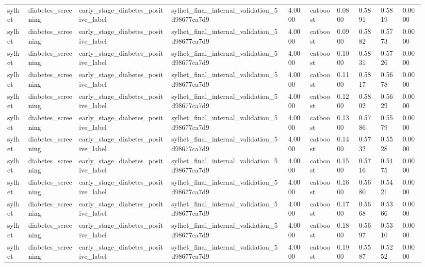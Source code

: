\begin{tabular}{llllllllll}
sylhet & diabetes\_screening & early\_stage\_diabetes\_positive\_label & sylhet\_final\_internal\_validation\_5d98677ca7d9 & 4.0000 & catboost & 0.0800 & 0.5891 & 0.5819 & 0.0000 \\
sylhet & diabetes\_screening & early\_stage\_diabetes\_positive\_label & sylhet\_final\_internal\_validation\_5d98677ca7d9 & 4.0000 & catboost & 0.0900 & 0.5882 & 0.5773 & 0.0000 \\
sylhet & diabetes\_screening & early\_stage\_diabetes\_positive\_label & sylhet\_final\_internal\_validation\_5d98677ca7d9 & 4.0000 & catboost & 0.1000 & 0.5831 & 0.5726 & 0.0000 \\
sylhet & diabetes\_screening & early\_stage\_diabetes\_positive\_label & sylhet\_final\_internal\_validation\_5d98677ca7d9 & 4.0000 & catboost & 0.1100 & 0.5817 & 0.5678 & 0.0000 \\
sylhet & diabetes\_screening & early\_stage\_diabetes\_positive\_label & sylhet\_final\_internal\_validation\_5d98677ca7d9 & 4.0000 & catboost & 0.1200 & 0.5802 & 0.5629 & 0.0000 \\
sylhet & diabetes\_screening & early\_stage\_diabetes\_positive\_label & sylhet\_final\_internal\_validation\_5d98677ca7d9 & 4.0000 & catboost & 0.1300 & 0.5786 & 0.5579 & 0.0000 \\
sylhet & diabetes\_screening & early\_stage\_diabetes\_positive\_label & sylhet\_final\_internal\_validation\_5d98677ca7d9 & 4.0000 & catboost & 0.1400 & 0.5732 & 0.5528 & 0.0000 \\
sylhet & diabetes\_screening & early\_stage\_diabetes\_positive\_label & sylhet\_final\_internal\_validation\_5d98677ca7d9 & 4.0000 & catboost & 0.1500 & 0.5716 & 0.5475 & 0.0000 \\
sylhet & diabetes\_screening & early\_stage\_diabetes\_positive\_label & sylhet\_final\_internal\_validation\_5d98677ca7d9 & 4.0000 & catboost & 0.1600 & 0.5680 & 0.5421 & 0.0000 \\
sylhet & diabetes\_screening & early\_stage\_diabetes\_positive\_label & sylhet\_final\_internal\_validation\_5d98677ca7d9 & 4.0000 & catboost & 0.1700 & 0.5668 & 0.5366 & 0.0000 \\
sylhet & diabetes\_screening & early\_stage\_diabetes\_positive\_label & sylhet\_final\_internal\_validation\_5d98677ca7d9 & 4.0000 & catboost & 0.1800 & 0.5697 & 0.5310 & 0.0000 \\
sylhet & diabetes\_screening & early\_stage\_diabetes\_positive\_label & sylhet\_final\_internal\_validation\_5d98677ca7d9 & 4.0000 & catboost & 0.1900 & 0.5587 & 0.5252 & 0.0000 \\

\end{tabular}

